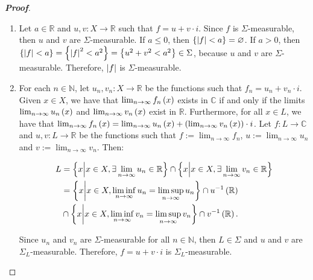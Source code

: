 \begin{corollary}
\begin{proof}[\rm\textbf{Proof}]
\begin{enumerate}
      If $\set{g=0}=\varnothing$, we also have:

      \begin{equation}
        \begin{split}
          \frac{f}{g} & =\frac{f\cdot\overline{g}}{\bars{g}^2}=\frac{\pr{u\cdot u'+v\cdot v'}+\pr{-u\cdot v'+v\cdot u'}\cdot i}{\pr{u'}^2+\pr{v'}^2}\\
          &=\frac{u\cdot u'+v\cdot v'}{\pr{u'}^2+\pr{v'}^2}+\frac{-u\cdot v'+v\cdot u'}{\pr{u'}^2+\pr{v'}^2}\cdot i.
        \end{split}
      \end{equation}
      
      Since $f$ is $\Sigma$-measurable, then $u$, $v$, $u'$ and $v'$ are $\Sigma$-measurable. Then the real and imaginary parts of the functions above are $\Sigma_L$-measurable and, consequently, the above functions themselves are $\Sigma_L$-measurable.

      \item Let $a\in\mathbb{R}$ and $u,v:X\rightarrow\mathbb{R}$ such that $f=u+v\cdot i$. Since $f$ is $\Sigma$-measurable, then $u$ and $v$ are $\Sigma$-measurable. If $a\leq 0$, then $\left\{\left|f\right|<a\right\}=\varnothing$. If $a>0$, then $\left\{\left|f\right|<a\right\}=\left\{\left|f\right|^2<a^2\right\}=\left\{u^2+v^2<a^2\right\}\in\Sigma$, because $u$ and $v$ are $\Sigma$-measurable. Therefore, $\left|f\right|$ is $\Sigma$-measurable.
      \item For each $n\in\mathbb{N}$, let $u_n,v_n:X\rightarrow\mathbb{R}$ be the functions such that $f_n=u_n+v_n\cdot i$. Given $x\in X$, we have that $\lim_{n\to\infty}{f_n\left(x\right)}$ exists in $\mathbb{C}$ if and only if the limits $\lim_{n\to\infty}{u_n\left(x\right)}$ and $\lim_{n\to\infty}{v_n\left(x\right)}$ exist in $\mathbb{R}$. Furthermore, for all $x\in L$, we have that $\lim_{n\to\infty}{f_n\left(x\right)}=\lim_{n\to\infty}{u_n\left(x\right)}+\left(\lim_{n\to\infty}{v_n\left(x\right)}\right)\cdot i$. Let $f:L\rightarrow\mathbb{C}$ and $u,v:L\rightarrow\mathbb{R}$ be the functions such that $f:=\lim_{n\to\infty}{f_n}$, $u:=\lim_{n\to\infty}{u_n}$ and $v:=\lim_{n\to\infty}{v_n}$. Then:
      
      \begin{equation}
        \begin{split}
          L & =\left\{x\middle|x\in X,\exists\lim_{n\to\infty}{u_n}\in\mathbb{R}\right\}\cap\left\{x\middle|x\in X,\exists\lim_{n\to\infty}{v_n}\in\mathbb{R}\right\}\\
          & =\left\{x\middle|x\in X,\liminf_{n\to\infty}{u_n}=\limsup_{n\to\infty}{u_n}\right\}\cap u^{-1}\left(\mathbb{R}\right)\\
          & \cap\left\{x\middle|x\in X,\liminf_{n\to\infty}{v_n}=\limsup_{n\to\infty}{v_n}\right\}\cap v^{-1}\left(\mathbb{R}\right).
        \end{split}
      \end{equation}

      Since $u_n$ and $v_n$ are $\Sigma$-measurable for all $n\in\mathbb{N}$, then $L\in\Sigma$ and $u$ and $v$ are $\Sigma_L$-measurable. Therefore, $f=u+v\cdot i$ is $\Sigma_L$-measurable.
    \end{enumerate}
  \end{proof}
\end{corollary}


